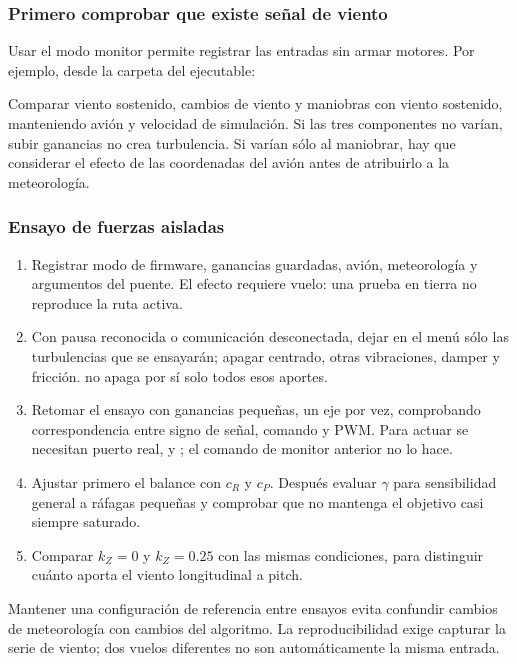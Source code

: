 \subsubsection{Primero comprobar que existe señal de viento}
Usar el modo monitor permite registrar las entradas sin armar motores. Por ejemplo, desde la carpeta del ejecutable:
\begin{quote}\small
{}
\end{quote}
Comparar viento sostenido, cambios de viento y maniobras con viento sostenido, manteniendo avión y velocidad de simulación. Si las tres componentes no varían, subir ganancias no crea turbulencia. Si varían sólo al maniobrar, hay que considerar el efecto de las coordenadas del avión antes de atribuirlo a la meteorología.

\subsubsection{Ensayo de fuerzas aisladas}
\begin{enumerate}
\item Registrar modo de firmware, ganancias guardadas, avión, meteorología y argumentos del puente. El efecto requiere vuelo: una prueba en tierra no reproduce la ruta activa.
\item Con pausa reconocida o comunicación desconectada, dejar en el menú sólo las turbulencias que se ensayarán; apagar centrado, otras vibraciones, damper y fricción.  no apaga por sí solo todos esos aportes.
\item Retomar el ensayo con ganancias pequeñas, un eje por vez, comprobando correspondencia entre signo de señal, comando y PWM. Para actuar se necesitan puerto real,  y ; el comando de monitor anterior no lo hace.
\item Ajustar primero el balance con $c_R$ y $c_P$. Después evaluar $\gamma$ para sensibilidad general a ráfagas pequeñas y comprobar que no mantenga el objetivo casi siempre saturado.
\item Comparar $k_Z=0$ y $k_Z=0.25$ con las mismas condiciones, para distinguir cuánto aporta el viento longitudinal a pitch.
\end{enumerate}
Mantener una configuración de referencia entre ensayos evita confundir cambios de meteorología con cambios del algoritmo. La reproducibilidad exige capturar la serie de viento; dos vuelos diferentes no son automáticamente la misma entrada.

